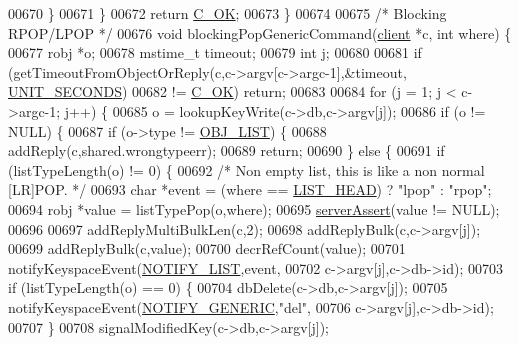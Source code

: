 \begin{DoxyCode}
00670         \}
00671     \}
00672     \textcolor{keywordflow}{return} \hyperlink{server_8h_a303769ef1065076e68731584e758d3e1}{C\_OK};
00673 \}
00674 
00675 \textcolor{comment}{/* Blocking RPOP/LPOP */}
00676 \textcolor{keywordtype}{void} blockingPopGenericCommand(\hyperlink{structclient}{client} *c, \textcolor{keywordtype}{int} where) \{
00677     robj *o;
00678     mstime\_t timeout;
00679     \textcolor{keywordtype}{int} j;
00680 
00681     \textcolor{keywordflow}{if} (getTimeoutFromObjectOrReply(c,c->argv[c->argc-1],&timeout,
      \hyperlink{server_8h_a8553b0a6c729b15594731a0d37b4fb0d}{UNIT\_SECONDS})
00682         != \hyperlink{server_8h_a303769ef1065076e68731584e758d3e1}{C\_OK}) \textcolor{keywordflow}{return};
00683 
00684     \textcolor{keywordflow}{for} (j = 1; j < c->argc-1; j++) \{
00685         o = lookupKeyWrite(c->db,c->argv[j]);
00686         \textcolor{keywordflow}{if} (o != NULL) \{
00687             \textcolor{keywordflow}{if} (o->type != \hyperlink{server_8h_a4a5f22a280949c97a0cb0d4213275126}{OBJ\_LIST}) \{
00688                 addReply(c,shared.wrongtypeerr);
00689                 \textcolor{keywordflow}{return};
00690             \} \textcolor{keywordflow}{else} \{
00691                 \textcolor{keywordflow}{if} (listTypeLength(o) != 0) \{
00692                     \textcolor{comment}{/* Non empty list, this is like a non normal [LR]POP. */}
00693                     \textcolor{keywordtype}{char} *event = (where == \hyperlink{server_8h_a5fc6a15ca26c6208f66ad2768a3108ef}{LIST\_HEAD}) ? \textcolor{stringliteral}{"lpop"} : \textcolor{stringliteral}{"rpop"};
00694                     robj *value = listTypePop(o,where);
00695                     \hyperlink{server_8h_a88114b5169b4c382df6b56506285e56a}{serverAssert}(value != NULL);
00696 
00697                     addReplyMultiBulkLen(c,2);
00698                     addReplyBulk(c,c->argv[j]);
00699                     addReplyBulk(c,value);
00700                     decrRefCount(value);
00701                     notifyKeyspaceEvent(\hyperlink{server_8h_a1c0b64c84b0e66dff3554ffe3e2ec4c8}{NOTIFY\_LIST},event,
00702                                         c->argv[j],c->db->id);
00703                     \textcolor{keywordflow}{if} (listTypeLength(o) == 0) \{
00704                         dbDelete(c->db,c->argv[j]);
00705                         notifyKeyspaceEvent(\hyperlink{server_8h_a9fa53dd1068e62365f3964ad3479eec2}{NOTIFY\_GENERIC},\textcolor{stringliteral}{"del"},
00706                                             c->argv[j],c->db->id);
00707                     \}
00708                     signalModifiedKey(c->db,c->argv[j]);

\end{DoxyCode}
